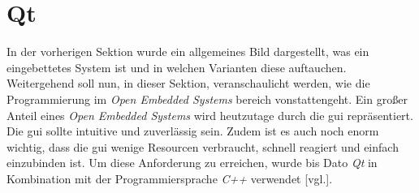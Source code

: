 \section{Qt}
\label{sec:qt}
In der vorherigen Sektion wurde ein allgemeines Bild dargestellt, was ein eingebettetes System
ist und in welchen Varianten diese auftauchen. Weitergehend soll nun, in dieser Sektion,
veranschaulicht werden, wie die Programmierung im \emph{Open Embedded Systems} bereich
vonstattengeht.
\newline
\newline
Ein großer Anteil eines \emph{Open Embedded Systems} wird heutzutage durch die \ac{gui}
repräsentiert. Die \ac{gui} sollte intuitive und zuverlässig sein.
Zudem ist es auch noch enorm wichtig, dass die \ac{gui} wenige Resourcen verbraucht, schnell
reagiert und einfach einzubinden ist. Um diese Anforderung zu erreichen, wurde bis Dato \emph{Qt} in
Kombination mit der Programmiersprache \emph{C++} verwendet \cite{QtOnEmbeddedLinux}[vgl.].

